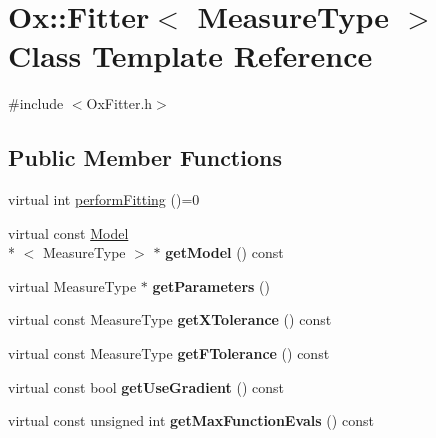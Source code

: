 \hypertarget{class_ox_1_1_fitter}{\section{Ox\-:\-:Fitter$<$ Measure\-Type $>$ Class Template Reference}
\label{class_ox_1_1_fitter}
}


{\ttfamily \#include $<$Ox\-Fitter.\-h$>$}

\subsection*{Public Member Functions}
\begin{DoxyCompactItemize}
\item 
virtual int \hyperlink{class_ox_1_1_fitter_a8f240f0da86d06b339ab2747e87f21b9}{perform\-Fitting} ()=0
\item 
\hypertarget{class_ox_1_1_fitter_aab3e83fef361dc2dfa855c4988af2393}{virtual const \hyperlink{class_ox_1_1_model}{Model}\\*
$<$ Measure\-Type $>$ $\ast$ {\bfseries get\-Model} () const }\label{class_ox_1_1_fitter_aab3e83fef361dc2dfa855c4988af2393}

\item 
\hypertarget{class_ox_1_1_fitter_a5e87dd37738745f98d904865f6b89219}{virtual Measure\-Type $\ast$ {\bfseries get\-Parameters} ()}\label{class_ox_1_1_fitter_a5e87dd37738745f98d904865f6b89219}

\item 
\hypertarget{class_ox_1_1_fitter_a21f92547f664c9b6f3fa8da4c7d16965}{virtual const Measure\-Type {\bfseries get\-X\-Tolerance} () const }\label{class_ox_1_1_fitter_a21f92547f664c9b6f3fa8da4c7d16965}

\item 
\hypertarget{class_ox_1_1_fitter_ac62bf275718aafc95b5e49d0aa9fc1ef}{virtual const Measure\-Type {\bfseries get\-F\-Tolerance} () const }\label{class_ox_1_1_fitter_ac62bf275718aafc95b5e49d0aa9fc1ef}

\item 
\hypertarget{class_ox_1_1_fitter_aba3fc8ad5260390faf59e2f904ab6d6d}{virtual const bool {\bfseries get\-Use\-Gradient} () const }\label{class_ox_1_1_fitter_aba3fc8ad5260390faf59e2f904ab6d6d}

\item 
\hypertarget{class_ox_1_1_fitter_a04f36e075f86c6a89df833d17b9f029d}{virtual const unsigned int {\bfseries get\-Max\-Function\-Evals} () const }\label{class_ox_1_1_fitter_a04f36e075f86c6a89df833d17b9f029d}


\end{DoxyCompactItemize}
